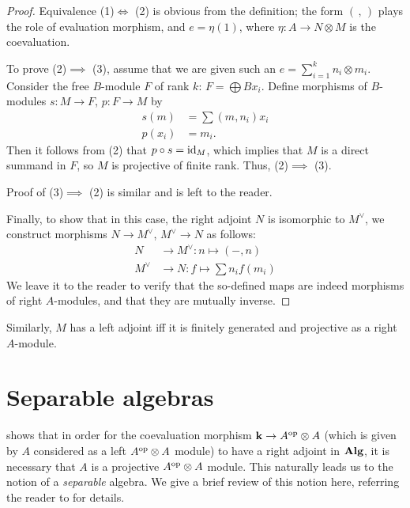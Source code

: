 \begin{proof}
  Equivalence (1)$\iff$ (2) is obvious from the definition; the form
  $(\, , \,)$ plays the role of evaluation morphism, and $e=\eta (1)$,
  where $\eta\colon A\to N\otimes M$ is the coevaluation.

  To prove (2)$\implies$ (3), assume that we are given such an
  $e=\sum_{i=1}^k n_i\otimes m_i$. Consider the free
  $B$-module $F$ of rank $k$: $F=\bigoplus B x_i$. Define morphisms
  of $B$-modules $s\colon M\to F$, $p\colon F\to M$ by
  \begin{align*}
  s(m)&=\sum (m, n_i)x_i\\
  p(x_i)&=m_i.
  \end{align*}
  Then it follows from (2) that $p\circ s =\operatorname{id}_{M}$, which implies that
  $M$ is a direct summand in $F$, so $M$ is projective of finite rank.
  Thus, (2)$\implies$ (3).

  Proof of (3)$\implies$ (2) is similar and is left to the reader.

  Finally, to show that in this case, the right adjoint $N$ is isomorphic
  to $M^\vee$, we construct morphisms $N\to M^\vee$, $M^\vee\to N$ as follows:
  \begin{align*}
    N&\to M^\vee\colon n\mapsto (-, n)\\
    M^\vee&\to N\colon f\mapsto \sum n_i f(m_i)
  \end{align*}
  We leave it to the reader to verify that the so-defined maps are indeed morphisms
  of right $A$-modules, and that they are mutually inverse.
\end{proof}

Similarly, $M$ has a left adjoint iff it is finitely generated and projective
as a right $A$-module.

\section{Separable algebras}\label{s:separable}

 shows that in order for the coevaluation morphism $\mathbf{k}
\to A^{\mathrm{op}}\otimes A$ (which is given by $A$ considered as a left $A^{\mathrm{op}} \otimes
A$ module) to have a right adjoint in $\mathbf{Alg}$, it is necessary that $A$ is a
projective $A^{\mathrm{op}}\otimes A$ module. This naturally leads us to the notion of a
\emph{separable} algebra. We give a brief review of this notion here, referring
the reader to \cite[Chapter 10]{pierce} for details.


